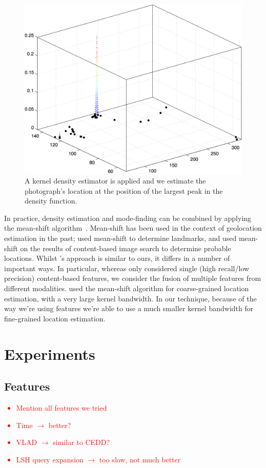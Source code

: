 \documentclass{../acm_proc_article-me11_tweaked}
\begin{document}
\begin{figure}
	\includegraphics[width=\columnwidth]{images/density}
	\caption{\label{fig:density}A kernel density estimator is applied and we estimate the photograph's location at the position of the largest peak in the density function.}
\end{figure}

In practice, density estimation and mode-finding can be combined by applying the mean-shift algorithm~\cite{1000236}. Mean-shift has been used in the context of geolocation estimation in the past; \citeauthor{Crandall:2009:MWP:1526709.1526812} used mean-shift to determine landmarks, and \citeauthor{Hays:2008:im2gps} used mean-shift on the results of content-based image search to determine probable locations. Whilst \citeauthor{Hays:2008:im2gps}'s approach is similar to ours, it differs in a number of important ways. In particular, whereas \citeauthor{Hays:2008:im2gps} only considered single (high recall/low precision) content-based features, we consider the fusion of multiple features from different modalities. \citeauthor{Hays:2008:im2gps} used the mean-shift algorithm for coarse-grained location estimation, with a very large kernel bandwidth. In our technique, because of the way we're using features we're able to use a much smaller kernel bandwidth for fine-grained location estimation.

\section{Experiments}
\subsection{Features}
\textcolor{red}{\begin{itemize}
    \item Mention all features we tried
    \item Time $\rightarrow$ better?
    \item VLAD $\rightarrow$ similar to CEDD?
    \item LSH query expansion $\rightarrow$ too slow, not much better
\end{itemize}}
\end{document}
